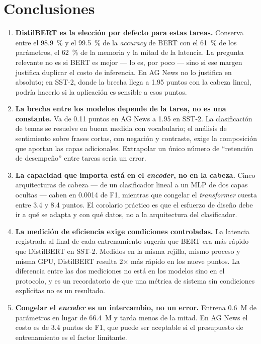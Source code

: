 \section{Conclusiones}

\begin{enumerate}

\item \textbf{DistilBERT es la elección por defecto para estas tareas.}
Conserva entre el \SI{98,9}{\percent} y el \SI{99,5}{\percent} de la
\textit{accuracy} de BERT con el \SI{61}{\percent} de los parámetros, el
\SI{62}{\percent} de la memoria y la mitad de la latencia. La pregunta
relevante no es si BERT es mejor --- lo es, por poco --- sino si ese margen
justifica duplicar el costo de inferencia. En AG News no lo justifica en
absoluto; en SST-2, donde la brecha llega a \num{1,95} puntos con la cabeza
lineal, podría hacerlo si la aplicación es sensible a esos puntos.

\item \textbf{La brecha entre los modelos depende de la tarea, no es una
constante.} Va de \num{0,11} puntos en AG News a \num{1,95} en SST-2. La
clasificación de temas se resuelve en buena medida con vocabulario; el
análisis de sentimiento sobre frases cortas, con negación y contraste, exige
la composición que aportan las capas adicionales. Extrapolar un único número
de ``retención de desempeño'' entre tareas sería un error.

\item \textbf{La capacidad que importa está en el \textit{encoder}, no en la
cabeza.} Cinco arquitecturas de cabeza --- de un clasificador lineal a un MLP
de dos capas ocultas --- caben en \num{0,0014} de F1, mientras que congelar el
\textit{transformer} cuesta entre \num{3,4} y \num{8,4} puntos. El corolario
práctico es que el esfuerzo de diseño debe ir a qué se adapta y con qué datos,
no a la arquitectura del clasificador.

\item \textbf{La medición de eficiencia exige condiciones controladas.} La
latencia registrada al final de cada entrenamiento sugería que BERT era más
rápido que DistilBERT en SST-2. Medidos en la misma rejilla, mismo proceso y
misma GPU, DistilBERT resulta \num{2}$\times$ más rápido en los nueve puntos.
La diferencia entre las dos mediciones no está en los modelos sino en el
protocolo, y es un recordatorio de que una métrica de sistema sin condiciones
explícitas no es un resultado.

\item \textbf{Congelar el \textit{encoder} es un intercambio, no un error.}
Entrena \num{0,6}~M de parámetros en lugar de \num{66,4}~M y tarda menos de la
mitad. En AG News el costo es de \num{3,4} puntos de F1, que puede ser
aceptable si el presupuesto de entrenamiento es el factor limitante.

\end{enumerate}
